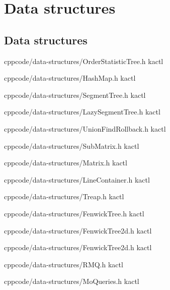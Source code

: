 \chapter{Data structures}

\section{Data structures}

{}{}
{cpp}{code/data-structures/OrderStatisticTree.h}
{kactl}

{}{}
{cpp}{code/data-structures/HashMap.h}
{kactl}

{}{}
{cpp}{code/data-structures/SegmentTree.h}
{kactl}

{}{}
{cpp}{code/data-structures/LazySegmentTree.h}
{kactl}

{}{}
{cpp}{code/data-structures/UnionFindRollback.h}
{kactl}

{}{}
{cpp}{code/data-structures/SubMatrix.h}
{kactl}

{}{}
{cpp}{code/data-structures/Matrix.h}
{kactl}

{}{}
{cpp}{code/data-structures/LineContainer.h}
{kactl}

{}{}
{cpp}{code/data-structures/Treap.h}
{kactl}

{}{}
{cpp}{code/data-structures/FenwickTree.h}
{kactl}

{}{}
{cpp}{code/data-structures/FenwickTree2d.h}
{kactl}

{}{}
{cpp}{code/data-structures/FenwickTree2d.h}
{kactl}

{}{}
{cpp}{code/data-structures/RMQ.h}
{kactl}

{}{}
{cpp}{code/data-structures/MoQueries.h}
{kactl}

